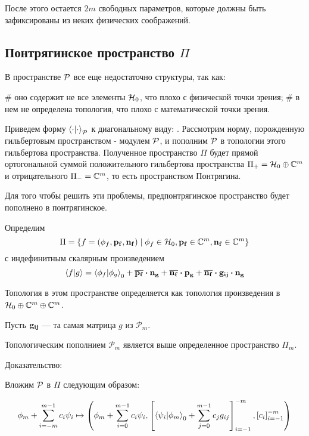 После этого остается $2 m$ свободных параметров, которые должны быть зафиксированы из неких физических соображений.

\subsection{Понтрягинское пространство $\Pi$}
В пространстве $\mathcal{P}$ все еще недостаточно структуры, так как:
\begin{ilist}
# оно содержит не все элементы $\mathcal{H}_{0}$, что плохо с физической точки зрения;
# в нем не определена топология, что плохо с математической точки зрения.
\end{ilist}

Приведем форму $\ipcdot_\mcP$ к диагональному виду: . Рассмотрим норму, порожденную гильбертовым пространством - модулем $\mathcal{P}$, и пополним $\mathcal{P}$ в топологии этого гильбертова пространства. Полученное пространство $\Pi$ будет прямой ортогональной суммой положительного гильбертова пространства $\Pi_+ = \mathcal{H}_{0} \oplus \mathbb{C}^m$ и отрицательного $\Pi_- = \mathbb{C}^m$, то есть пространством Понтрягина.

Для того чтобы решить эти проблемы, предпонтрягинское пространство будет пополнено в понтрягинское.

Определим 
\[
\Pi = \{f = (\phi_f, \vb{p_f}, \vb{n_f}) \mid \phi_f \in \mathcal{H}_{0}, \vb{p_f} \in \mathbb{C}^m, \vb{n_f} \in \mathbb{C}^m \}
\]
с индефинитным скалярным произведением
\[
\ip{f}{g} =
\ip{\phi_f}{\phi_g}_0 +
\cconj{\vb{p_f}} \vdot \vb{n_g} +
\cconj{\vb{n_f}} \vdot \vb{p_g} + 
\cconj{\vb{n_f}} \vdot \vb{g_{ij}} \vdot \vb{n_g}
\]

Топология в этом пространстве определяется как топология произведения в $\mathcal{H}_{0} \oplus \mathbb{C}^m \oplus \mathbb{C}^m$.

Пусть $\vb{g_{ij}}$ — та самая матрица $g$ из $\mathcal{P}_m$. 

\begin{theorem}
Топологическим пополнием $\mathcal{P}_m$ является выше определенное пространство $\Pi_m$.
\end{theorem}

Доказательство: 


Вложим $\mathcal{P}$ в $\Pi$ следующим образом:

\[
\phi_m + \sum\limits_{i = -m}^{m - 1} c_i \psi_i \mapsto
\left(
\phi_m + \sum\limits_{i = 0}^{m - 1} c_i \psi_i,
\left[ \ip{\psi_i}{\phi_m}_0 + \sum\limits_{j = 0}^{m - 1} c_j g_{ij} \right]_{i = -1}^{-m},
\left[ c_i \right]_{i = -1}^{-m}
\right)
\]

